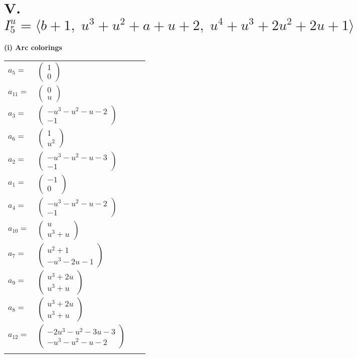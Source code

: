 \documentclass[1p]{elsarticle_modified}
\theoremstyle{definition}
\begin{document}
\centering \section*{V. $I^u_{5}= \langle b+1,\;u^3+u^2+a+u+2,\;u^4+u^3+2 u^2+2 u+1 \rangle$}
\flushleft \textbf{(i) Arc colorings}\\
\begin{tabular}{m{7pt} m{180pt} m{7pt} m{180pt} }
\flushright $a_{5}=$&$\begin{pmatrix}1\\0\end{pmatrix}$ \\
\flushright $a_{11}=$&$\begin{pmatrix}0\\u\end{pmatrix}$ \\
\flushright $a_{3}=$&$\begin{pmatrix}- u^3- u^2- u-2\\-1\end{pmatrix}$ \\
\flushright $a_{6}=$&$\begin{pmatrix}1\\u^2\end{pmatrix}$ \\
\flushright $a_{2}=$&$\begin{pmatrix}- u^3- u^2- u-3\\-1\end{pmatrix}$ \\
\flushright $a_{1}=$&$\begin{pmatrix}-1\\0\end{pmatrix}$ \\
\flushright $a_{4}=$&$\begin{pmatrix}- u^3- u^2- u-2\\-1\end{pmatrix}$ \\
\flushright $a_{10}=$&$\begin{pmatrix}u\\u^3+u\end{pmatrix}$ \\
\flushright $a_{7}=$&$\begin{pmatrix}u^2+1\\- u^3-2 u-1\end{pmatrix}$ \\
\flushright $a_{9}=$&$\begin{pmatrix}u^3+2 u\\u^3+u\end{pmatrix}$ \\
\flushright $a_{8}=$&$\begin{pmatrix}u^3+2 u\\u^3+u\end{pmatrix}$ \\
\flushright $a_{12}=$&$\begin{pmatrix}-2 u^3- u^2-3 u-3\\- u^3- u^2- u-2\end{pmatrix}$\\&\end{tabular}
\end{document}
